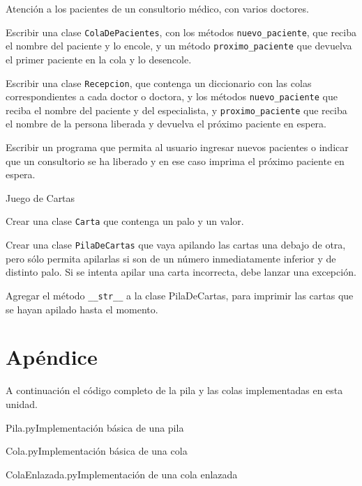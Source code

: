 \begin{ejercicio}
Atención a los pacientes de un consultorio médico, con varios doctores.
\begin{partes}
    \item Escribir una clase \verb|ColaDePacientes|, con los métodos
\verb|nuevo_paciente|, que reciba el nombre del paciente y lo encole, y un
método \verb|proximo_paciente| que devuelva el primer paciente en la cola y
lo desencole.
    \item Escribir una clase \verb|Recepcion|, que contenga un diccionario con
las colas correspondientes a cada doctor o doctora, y los métodos
\verb|nuevo_paciente| que reciba el nombre del paciente y del especialista, y
\verb|proximo_paciente| que reciba el nombre de la persona liberada y
devuelva el próximo paciente en espera.
    \item Escribir un programa que permita al usuario ingresar nuevos pacientes
o indicar que un consultorio se ha liberado y en ese caso imprima el
próximo paciente en espera.
\end{partes}
\end{ejercicio}


\begin{ejercicio}
Juego de Cartas
\begin{partes}
    \item Crear una clase \verb|Carta| que contenga un palo y un valor.
    \item Crear una clase \verb|PilaDeCartas| que vaya apilando las cartas una
debajo de otra, pero sólo permita apilarlas si son de un número
inmediatamente inferior y de distinto palo. Si se intenta apilar una carta
incorrecta, debe lanzar una excepción.
    \item Agregar el método \verb|__str__| a la clase PilaDeCartas, para
imprimir las cartas que se hayan apilado hasta el momento.
\end{partes}
\end{ejercicio}

\newpage
\section{Apéndice}

A continuación el código completo de la pila y las colas implementadas en
esta unidad.

\begin{codigo}{Pila.py}{Implementación básica de una pila}

\end{codigo}

\begin{codigo}{Cola.py}{Implementación básica de una cola}

\end{codigo}

\begin{codigo}{ColaEnlazada.py}{Implementación de una cola enlazada}

\end{codigo}

